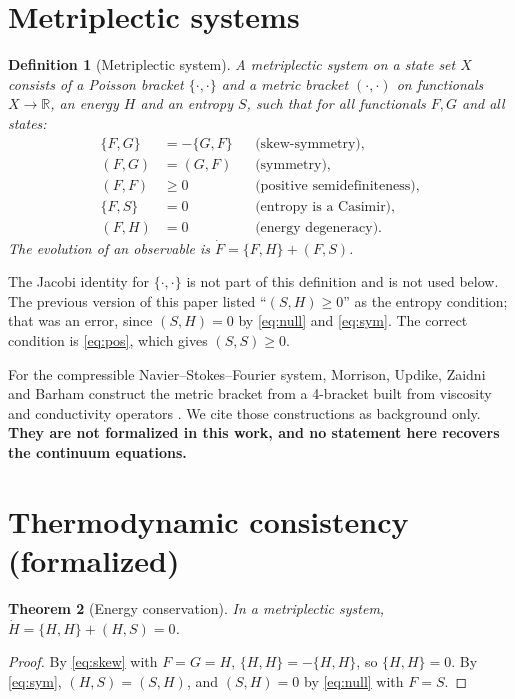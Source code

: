 \documentclass[11pt,a4paper]{article}
\newtheorem{theorem}{Theorem}[section]
\newtheorem{definition}[theorem]{Definition}
\begin{document}
\section{Metriplectic systems}\label{sec:metriplectic}
\begin{definition}[Metriplectic system]\label{def:ms}
A metriplectic system on a state set \(X\) consists of a Poisson bracket \(\{\cdot,\cdot\}\) and a metric
bracket \((\cdot,\cdot)\) on functionals \(X\to\mathbb{R}\), an energy \(H\) and an entropy \(S\), such that
for all functionals \(F,G\) and all states:
\begin{align}
\{F,G\} &= -\{G,F\} && \text{(skew-symmetry)},\label{eq:skew}\\
(F,G) &= (G,F) && \text{(symmetry)},\label{eq:sym}\\
(F,F) &\ge 0 && \text{(positive semidefiniteness)},\label{eq:pos}\\
\{F,S\} &= 0 && \text{(entropy is a Casimir)},\label{eq:cas}\\
(F,H) &= 0 && \text{(energy degeneracy)}.\label{eq:null}
\end{align}
The evolution of an observable is \(\dot F = \{F,H\} + (F,S)\).
\end{definition}
The Jacobi identity for \(\{\cdot,\cdot\}\) is not part of this definition and is not used below.
The previous version of this paper listed ``\((S,H)\ge 0\)'' as the entropy condition; that was an
error, since \((S,H)=0\) by \eqref{eq:null} and \eqref{eq:sym}. The correct condition is
\eqref{eq:pos}, which gives \((S,S)\ge0\).

For the compressible Navier--Stokes--Fourier system, Morrison, Updike, Zaidni and Barham construct
the metric bracket from a 4-bracket built from viscosity and conductivity operators
\cite{MorrisonUpdike2024,ZaidniMorrisonBenjelloun2024,BarhamMorrisonZaidni2024}. We cite those
constructions as background only. \textbf{They are not formalized in this work, and no statement
here recovers the continuum equations.}

\section{Thermodynamic consistency (formalized)}\label{sec:thermo}
\begin{theorem}[Energy conservation]\label{thm:energy}
In a metriplectic system, \(\dot H = \{H,H\} + (H,S) = 0\).
\end{theorem}
\begin{proof}
By \eqref{eq:skew} with \(F=G=H\), \(\{H,H\}=-\{H,H\}\), so \(\{H,H\}=0\). By \eqref{eq:sym},
\((H,S)=(S,H)\), and \((S,H)=0\) by \eqref{eq:null} with \(F=S\).
\end{proof}
\end{document}
